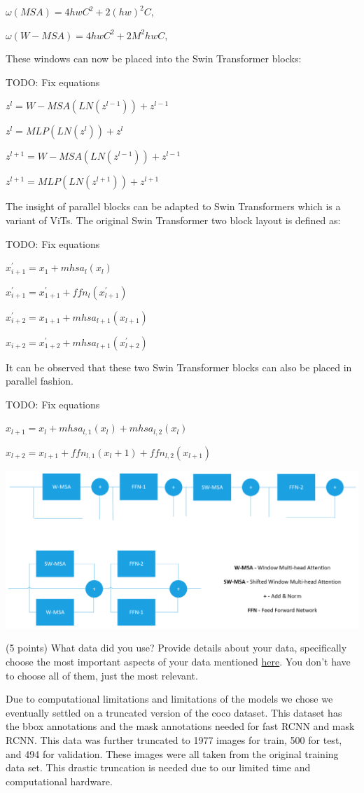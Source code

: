 \documentclass[10pt,twocolumn,letterpaper]{article}
\begin{document}
$\omega(MSA) = 4hwC^2 + 2(hw)^{2}C,$

$\omega(W-MSA) = 4hwC^2 + 2M^{2}hwC,$

These windows can now be placed into the Swin Transformer blocks:

TODO: Fix equations

$z^{l} = W-MSA (LN(z^{l-1})) + z^{l-1}$

$z^{l} = MLP (LN(z^{l})) + z^{l}$

$z^{l+1} = W-MSA (LN(z^{l-1})) + z^{l-1}$

$z^{l+1} = MLP (LN(z^{l+1})) + z^{l+1}$

The insight of parallel blocks can be adapted to Swin Transformers\cite{liu2021swin} which is a variant of ViTs. The original Swin Transformer two block layout is defined as:

TODO: Fix equations

$x^{'}_{i+1} = x_1 + mhsa_l(x_l)$

$x^{'}_{i+1} = x^{'}_{1+1} + ffn_l(x^{'}_{l+1})$

$x^{'}_{i+2} = x_{1+1} + mhsa_{l+1}(x_{l+1})$

$x_{i+2} = x^{'}_{1+2} + mhsa_{l+1}(x^{'}_{l+2})$

It can be observed that these two Swin Transformer blocks can also be placed in parallel fashion.

TODO: Fix equations

$x_{l+1} = x_{l} + mhsa_{l,1}(x_l) + mhsa_{l,2}(x_l)$

$x_{l+2} = x_{l+1} + ffn_{l,1}(x_l+1) + ffn_{l,2}(x_{l+1})$

\includegraphics[width=0.8\linewidth]{docs/latex/images/MSA-Swin.png}
\caption{}

(5 points) What data did you use? Provide details about your data, specifically choose the most important aspects of your data mentioned \href{https://arxiv.org/abs/1803.09010}{here}. You don’t have to choose all of them, just the most relevant.

Due to computational limitations and limitations of the models we chose we eventually settled on a truncated version of the coco dataset. This dataset has the bbox annotations and the mask annotations needed for fast RCNN and mask RCNN. This data was further truncated to 1977 images for train, 500 for test, and 494 for validation. These images were all taken from the original training data set. This drastic truncation is needed due to our limited time and computational hardware.  
\end{document}
